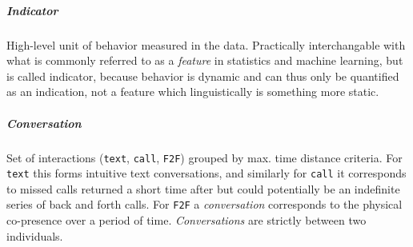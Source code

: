 \subparagraph*{Indicator} High-level unit of behavior measured in the data. Practically interchangable with what is commonly referred to as a \textit{feature} in statistics and machine learning, but is called indicator, because behavior is dynamic and can thus only be quantified as an indication, not a feature which linguistically is something more static.
\subparagraph*{Conversation} Set of interactions (\texttt{text}, \texttt{call}, \texttt{F2F}) grouped by max. time distance criteria. For \texttt{text} this forms intuitive text conversations, and similarly for \texttt{call} it corresponds to missed calls returned a short time after but could potentially be an indefinite series of back and forth calls. For \texttt{F2F} a \textit{conversation} corresponds to the physical co-presence over a period of time. \textit{Conversations} are strictly between two individuals.